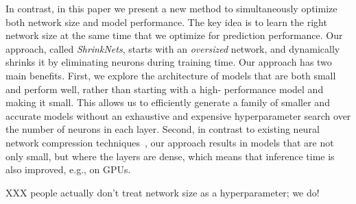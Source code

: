 In contrast, in this paper we present a new method to simultaneously optimize
both network size and model performance. The key idea is to learn the right
network size at the same time that we optimize for prediction performance. Our
approach, called {\it ShrinkNets}, starts with an {\it oversized} network, and
dynamically shrinks it by eliminating neurons during training time.  Our
approach has two main benefits.  First, we explore the architecture of models
that are both small and perform well, rather than starting with a high-
performance model and making it small.  This allows us to efficiently generate
a family of smaller and accurate models without an exhaustive and expensive
hyperparameter search over the number of neurons in each layer. Second, in
contrast to existing neural network compression techniques~\cite{Aghasi2016,han2015deepcompression}, our approach results in models that are
not only small, but where the  layers are dense, which means that inference
time is also improved, e.g., on GPUs.

XXX people actually don't treat network size as a hyperparameter;  we do!



